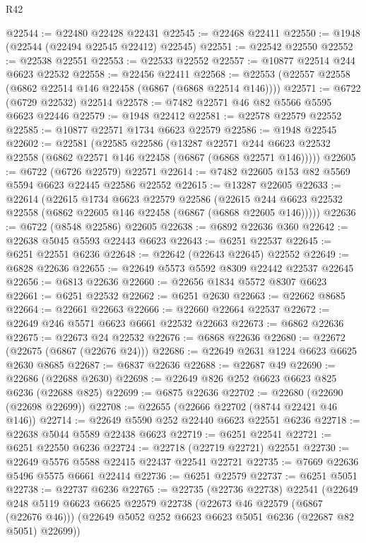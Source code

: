 \begin{lexlean}{R42}
\begin{coremodule}
{@22544 := @22480 @22428 @22431
@22545 := @22468 @22411
@22550 := @1948 (@22544 (@22494 @22545 @22412) @22545)
@22551 := @22542 @22550
@22552 := @22538 @22551
@22553 := @22533 @22552
@22557 := @10877 @22514 @244 @6623 @22532
@22558 := @22456 @22411
@22568 := @22553 (@22557 @22558 (@6862 @22514 @146 @22458 (@6867 (@6868 @22514 @146))))
@22571 := @6722 (@6729 @22532) @22514
@22578 := @7482 @22571 @46 @82 @5566 @5595 @6623 @22446
@22579 := @1948 @22412
@22581 := @22578 @22579 @22552
@22585 := @10877 @22571 @1734 @6623 @22579
@22586 := @1948 @22545
@22602 := @22581
    (@22585
      @22586
      (@13287
        @22571
        @244
        @6623
        @22532
        @22558
        (@6862 @22571 @146 @22458 (@6867 (@6868 @22571 @146)))))
@22605 := @6722 (@6726 @22579) @22571
@22614 := @7482 @22605 @153 @82 @5569 @5594 @6623 @22445 @22586 @22552
@22615 := @13287 @22605
@22633 := @22614
    (@22615
      @1734
      @6623
      @22579
      @22586
      (@22615 @244 @6623 @22532 @22558 (@6862 @22605 @146 @22458 (@6867 (@6868 @22605 @146)))))
@22636 := @6722 (@8548 @22586) @22605
@22638 := @6892 @22636 @360
@22642 := @22638 @5045 @5593 @22443 @6623
@22643 := @6251 @22537
@22645 := @6251 @22551 @6236
@22648 := @22642 (@22643 @22645) @22552
@22649 := @6828 @22636
@22655 := @22649 @5573 @5592 @8309 @22442 @22537 @22645
@22656 := @6813 @22636
@22660 := @22656 @1834 @5572 @8307 @6623
@22661 := @6251 @22532
@22662 := @6251 @2630
@22663 := @22662 @8685
@22664 := @22661 @22663
@22666 := @22660 @22664 @22537
@22672 := @22649 @246 @5571 @6623 @6661 @22532 @22663
@22673 := @6862 @22636
@22675 := @22673 @24 @22532
@22676 := @6868 @22636
@22680 := @22672 (@22675 (@6867 (@22676 @24)))
@22686 := @22649 @2631 @1224 @6623 @6625 @2630 @8685
@22687 := @6837 @22636
@22688 := @22687 @49
@22690 := @22686 (@22688 @2630)
@22698 := @22649 @826 @252 @6623 @6623 @825 @6236 (@22688 @825)
@22699 := @6875 @22636
@22702 := @22680 (@22690 (@22698 @22699))
@22708 := @22655 (@22666 @22702 (@8744 @22421 @46 @146))
@22714 := @22649 @5590 @252 @22440 @6623 @22551 @6236
@22718 := @22638 @5044 @5589 @22438 @6623
@22719 := @6251 @22541
@22721 := @6251 @22550 @6236
@22724 := @22718 (@22719 @22721) @22551
@22730 := @22649 @5576 @5588 @22415 @22437 @22541 @22721
@22735 := @7669 @22636 @5496 @5575 @6661 @22414
@22736 := @6251 @22579
@22737 := @6251 @5051
@22738 := @22737 @6236
@22765 := @22735
    (@22736 @22738)
    @22541
    (@22649
      @248
      @5119
      @6623
      @6625
      @22579
      @22738
      (@22673 @46 @22579 (@6867 (@22676 @46)))
      (@22649 @5052 @252 @6623 @6623 @5051 @6236 (@22687 @82 @5051) @22699))
}
\end{coremodule}
\end{lexlean}
